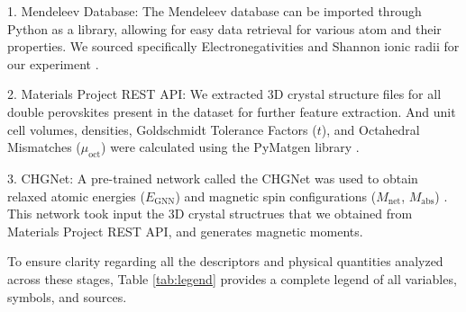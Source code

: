 \documentclass[12pt,onecolumn]{elsarticle}
\begin{document}
1. Mendeleev Database: The Mendeleev database can be imported through Python as a library, allowing for easy data retrieval for various atom and their properties. We sourced specifically Electronegativities and Shannon ionic radii for our experiment \cite{goldschmidt, shannon}.

2. Materials Project REST API: We extracted 3D crystal structure files for all double perovskites present in the dataset for further feature extraction. And unit cell volumes, densities, Goldschmidt Tolerance Factors ($t$), and Octahedral Mismatches ($\mu_{\text{oct}}$) were calculated using the PyMatgen library \cite{materialsproject}.

3. CHGNet: A pre-trained network called the CHGNet was used to obtain relaxed atomic energies ($E_{\text{GNN}}$) and magnetic spin configurations ($M_{\text{net}}$, $M_{\text{abs}}$) \cite{chgnet}. This network took input the 3D crystal structrues that we obtained from Materials Project REST API, and generates magnetic moments.

To ensure clarity regarding all the descriptors and physical quantities analyzed across these stages, Table \ref{tab:legend} provides a complete legend of all variables, symbols, and sources.
\end{document}
